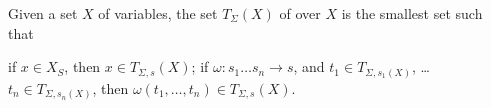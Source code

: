 \begin{Definition}[Label=DefTerms,Title=Terms over $\Sigma$]
Given a set $X$ of variables, the set $T_\Sigma(X)$ of
 over $X$ is the smallest set such that 
\begin{List}[Label=TermFormationRules,ListType=itemize]
  \ListItem
  if $x\in X_S$, then $x\in T_{\Sigma, s}(X)$;
  \ListItem
  if $\omega:s_1\ldots s_n\rightarrow s$, and
  $t_1\in T_{\Sigma,{s_1}(X)}$, \ldots
  $t_n\in T_{\Sigma,{s_n}(X)}$, then 
  $\omega(t_1,\ldots, t_n)\in T_{\Sigma,s}(X)$.
\end{List}
\end{Definition}
